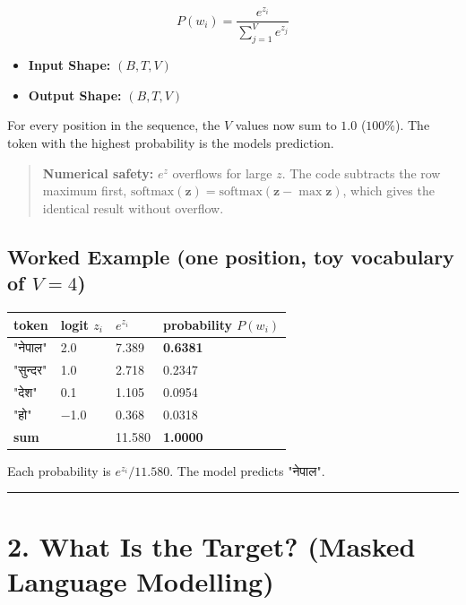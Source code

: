 \documentclass[11pt,a4paper,oneside]{report}
\providecommand{\tightlist}{\setlength{\itemsep}{0pt}\setlength{\parskip}{0pt}}
\begin{document}
\[P(w_i) = \frac{e^{z_i}}{\sum_{j=1}^{V} e^{z_j}}\]

\begin{itemize}
\tightlist
\item
  \textbf{Input Shape:} \((B, T, V)\)
\item
  \textbf{Output Shape:} \((B, T, V)\)
\end{itemize}

For every position in the sequence, the \(V\) values now sum to \(1.0\) (\(100\%\)). The token with the highest probability is the model\textquotesingle s prediction.

\begin{quote}
\textbf{Numerical safety:} \(e^{z}\) overflows for large \(z\). The code subtracts the row maximum first, \(\text{softmax}(\mathbf{z}) = \text{softmax}(\mathbf{z} - \max \mathbf{z})\), which gives the identical result without overflow.
\end{quote}

\subsection{\texorpdfstring{Worked Example (one position, toy vocabulary of \(V = 4\))}{Worked Example (one position, toy vocabulary of V = 4)}}\label{worked-example-one-position-toy-vocabulary-of-v--4}

{\def\LTcaptype{none} %
\begin{longtable}[]{@{}llll@{}}
\toprule\noalign{}
token & logit \(z_i\) & \(e^{z_i}\) & probability \(P(w_i)\) \\
\midrule\noalign{}
\endhead
\bottomrule\noalign{}
\endlastfoot
"नेपाल" & 2.0 & 7.389 & \textbf{0.6381} \\
"सुन्दर" & 1.0 & 2.718 & 0.2347 \\
"देश" & 0.1 & 1.105 & 0.0954 \\
"हो" & −1.0 & 0.368 & 0.0318 \\
\textbf{sum} & & 11.580 & \textbf{1.0000} \\
\end{longtable}
}

Each probability is \(e^{z_i} / 11.580\). The model predicts "नेपाल".

\begin{center}\rule{0.5\linewidth}{0.5pt}\end{center}

\section{2. What Is the Target? (Masked Language Modelling)}\label{2-what-is-the-target-masked-language-modelling}
\end{document}
